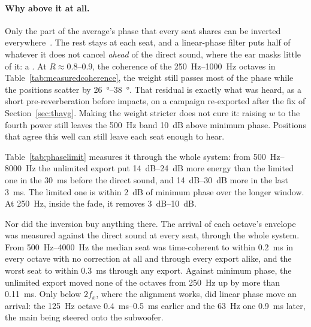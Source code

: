 \paragraph{Why above it at all.} Only the part of the average's phase that every seat shares can be inverted everywhere~\cite{NeelyAllen, Mourjopoulos1994}. The rest stays at each seat, and a linear-phase filter puts half of whatever it does not cancel \emph{ahead} of the direct sound, where the ear masks little of it: a . At $R\approx0.8$--$0.9$, the coherence of the \SIrange{250}{1000}{\hertz} octaves in Table~\ref{tab:measuredcoherence}, the weight still passes most of the phase while the positions scatter by \SIrange{26}{38}{\degree}. That residual is exactly what was heard, as a short pre-reverberation before impacts, on a campaign re-exported after the fix of Section~\ref{sec:thavg}. Making the weight stricter does not cure it: raising $w$ to the fourth power still leaves the \SI{500}{\hertz} band \SI{10}{\dB} above minimum phase. Positions that agree this well can still leave each seat enough to hear.

Table~\ref{tab:phaselimit} measures it through the whole system: from \SIrange{500}{8000}{\hertz} the unlimited export put \SIrange{14}{24}{\dB} more energy than the limited one in the \SI{30}{\milli\second} before the direct sound, and \SIrange{14}{30}{\dB} more in the last \SI{3}{\milli\second}. The limited one is within \SI{2}{\dB} of minimum phase over the longer window. At \SI{250}{\hertz}, inside the fade, it removes \SIrange{3}{10}{\dB}.

Nor did the inversion buy anything there. The arrival of each octave's envelope was measured against the direct sound at every seat, through the whole system. From \SIrange{500}{4000}{\hertz} the median seat was time-coherent to within \SI{0.2}{\milli\second} in every octave with no correction at all and through every export alike, and the worst seat to within \SI{0.3}{\milli\second} through any export. Against minimum phase, the unlimited export moved none of the octaves from \SI{250}{\hertz} up by more than \SI{0.11}{\milli\second}. Only below $2f_x$, where the alignment works, did linear phase move an arrival: the \SI{125}{\hertz} octave \SIrange{0.4}{0.5}{\milli\second} earlier and the \SI{63}{\hertz} one \SI{0.9}{\milli\second} later, the main being steered onto the subwoofer.

